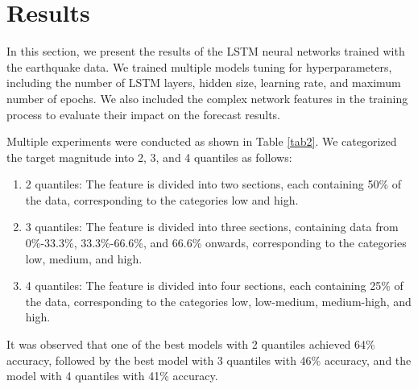 \documentclass[sn-mathphys-num]{sn-jnl}
\begin{document}
\section{Results}\label{results}

In this section, we present the results of the LSTM neural networks trained with the earthquake data. We trained multiple models tuning for hyperparameters, including the number of LSTM layers, hidden size, learning rate, and maximum number of epochs. We also included the complex network features in the training process to evaluate their impact on the forecast results.

Multiple experiments were conducted as shown in Table \ref{tab2}. We categorized the target magnitude into 2, 3, and 4 quantiles as follows:
\begin{enumerate}
    \item 2 quantiles: The feature is divided into two sections, each containing 50\% of the data, corresponding to the categories low and high.
    \item 3 quantiles: The feature is divided into three sections, containing data from 0\%-33.3\%, 33.3\%-66.6\%, and 66.6\% onwards, corresponding to the categories low, medium, and high.
    \item 4 quantiles: The feature is divided into four sections, each containing 25\% of the data, corresponding to the categories low, low-medium, medium-high, and high.
\end{enumerate}

It was observed that one of the best models with 2 quantiles achieved 64\% accuracy, followed by the best model with 3 quantiles with 46\% accuracy, and the model with 4 quantiles with 41\% accuracy.
\end{document}
